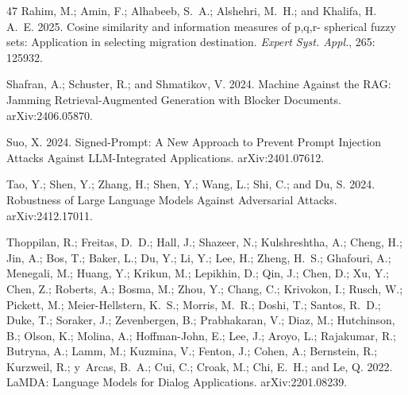 \documentclass[letterpaper]{article} %
\begin{document}
\begin{thebibliography}{47}
    Rahim, M.; Amin, F.; Alhabeeb, S.~A.; Alshehri, M.~H.; and Khalifa, H. A.~E. 2025.
    \newblock Cosine similarity and information measures of p,q,r- spherical fuzzy sets: Application in selecting migration destination.
    \newblock \emph{Expert Syst. Appl.}, 265: 125932.
    
    Shafran, A.; Schuster, R.; and Shmatikov, V. 2024.
    \newblock Machine Against the {RAG:} Jamming Retrieval-Augmented Generation with Blocker Documents.
    \newblock arXiv:2406.05870.
    
    Suo, X. 2024.
    \newblock Signed-Prompt: {A} New Approach to Prevent Prompt Injection Attacks Against LLM-Integrated Applications.
    \newblock arXiv:2401.07612.
    
    Tao, Y.; Shen, Y.; Zhang, H.; Shen, Y.; Wang, L.; Shi, C.; and Du, S. 2024.
    \newblock Robustness of Large Language Models Against Adversarial Attacks.
    \newblock arXiv:2412.17011.
    
    Thoppilan, R.; Freitas, D.~D.; Hall, J.; Shazeer, N.; Kulshreshtha, A.; Cheng, H.; Jin, A.; Bos, T.; Baker, L.; Du, Y.; Li, Y.; Lee, H.; Zheng, H.~S.; Ghafouri, A.; Menegali, M.; Huang, Y.; Krikun, M.; Lepikhin, D.; Qin, J.; Chen, D.; Xu, Y.; Chen, Z.; Roberts, A.; Bosma, M.; Zhou, Y.; Chang, C.; Krivokon, I.; Rusch, W.; Pickett, M.; Meier{-}Hellstern, K.~S.; Morris, M.~R.; Doshi, T.; Santos, R.~D.; Duke, T.; Soraker, J.; Zevenbergen, B.; Prabhakaran, V.; Diaz, M.; Hutchinson, B.; Olson, K.; Molina, A.; Hoffman{-}John, E.; Lee, J.; Aroyo, L.; Rajakumar, R.; Butryna, A.; Lamm, M.; Kuzmina, V.; Fenton, J.; Cohen, A.; Bernstein, R.; Kurzweil, R.; y~Arcas, B.~A.; Cui, C.; Croak, M.; Chi, E.~H.; and Le, Q. 2022.
    \newblock LaMDA: Language Models for Dialog Applications.
    \newblock arXiv:2201.08239.
    

\end{thebibliography}
\end{document}
